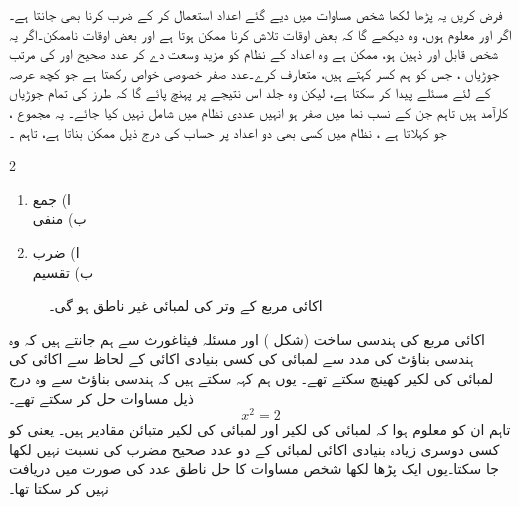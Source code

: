 فرض کریں یہ پڑھا لکھا شخص   مساوات  میں دیے گئے اعداد استعمال کر کے ضرب کرنا بھی جانتا ہے۔اگر   اور  معلوم ہوں،  وہ دیکھے گا کہ بعض اوقات    تلاش کرنا ممکن ہوتا ہے اور بعض اوقات ناممکن۔اگر یہ شخص قابل اور ذہین ہو، ممکن ہے وہ اعداد کے نظام کو مزید وسعت دے کر      عدد صحیح  اور  کی مرتب جوڑیاں  ،  جس کو ہم کسر  کہتے ہیں،  متعارف کرے۔عدد صفر  خصوصی خواص رکھتا ہے جو کچھ عرصہ کے لئے مسئلے پیدا کر سکتا ہے، لیکن وہ جلد اس نتیجے پر پہنچ پائے  گا کہ  طرز کی  تمام  جوڑیاں کارآمد ہیں تاہم    جن کے نسب نما میں صفر  ہو انہیں  عددی نظام میں شامل نہیں  کیا جائے۔ یہ 
مجموع ، جو  کہلاتا ہے ،  نظام میں کسی بھی دو اعداد  پر حساب کی     درج ذیل     ممکن بناتا ہے، تاہم ۔
\begin{multicols}{2}
\begin{enumerate}[1.]
\item
ا) جمع\\
ب) منفی
\item
ا) ضرب\\
ب) تقسیم
\end{enumerate}
\end{multicols}
%
\begin{figure}
\centering
{}
\caption{اکائی مربع کے وتر  کی لمبائی  غیر ناطق  ہو گی۔}
\label{شکل_ضمیمہ_تین_ایک}
\end{figure}
 
اکائی مربع کی ہندسی ساخت (شکل ) اور مسئلہ فیثاغورث سے ہم جانتے ہیں کہ وہ  ہندسی  بناؤٹ کی مدد سے لمبائی کی کسی بنیادی اکائی کے لحاظ سے     اکائی کی  لمبائی  کی لکیر کھینچ سکتے تھے۔ یوں ہم کہہ سکتے ہیں کہ ہندسی  بناؤٹ سے وہ درج ذیل مساوات حل کر سکتے تھے۔
\[x^2=2\]
تاہم  ان کو معلوم ہوا کہ      لمبائی کی لکیر اور  لمبائی کی لکیر    متبائن  مقادیر ہیں۔ یعنی      کو کسی دوسری زیادہ بنیادی اکائی لمبائی    کے دو عدد صحیح   مضرب کی نسبت  نہیں لکھا جا سکتا۔یوں ایک پڑھا لکھا شخص مساوات  کا حل ناطق عدد کی صورت میں دریافت نہیں کر سکتا تھا۔

